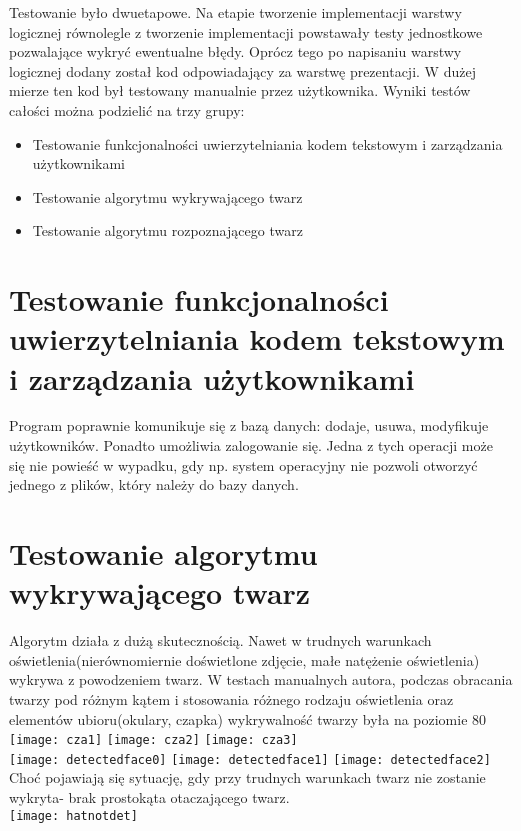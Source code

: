 \documentclass[eng,printmode]{mgr}
\begin{document}
Testowanie było dwuetapowe. Na etapie tworzenie implementacji warstwy logicznej równolegle z tworzenie implementacji powstawały testy jednostkowe pozwalające wykryć ewentualne błędy. Oprócz tego po napisaniu warstwy logicznej dodany został kod odpowiadający za warstwę prezentacji. W dużej mierze ten kod był testowany manualnie przez użytkownika. Wyniki testów całości można podzielić na trzy grupy:
\begin{itemize}
\item{Testowanie funkcjonalności uwierzytelniania kodem tekstowym i zarządzania użytkownikami}
\item{Testowanie algorytmu wykrywającego twarz}
\item{Testowanie algorytmu rozpoznającego twarz}
\end{itemize}

\section{Testowanie funkcjonalności uwierzytelniania kodem tekstowym i zarządzania użytkownikami}
Program poprawnie komunikuje się z bazą danych: dodaje, usuwa, modyfikuje użytkowników. Ponadto umożliwia zalogowanie się. Jedna z tych operacji może się nie powieść w wypadku, gdy np. system operacyjny nie pozwoli otworzyć jednego z plików, który należy do bazy danych.

\section{Testowanie algorytmu wykrywającego twarz}
Algorytm działa z dużą skutecznością. Nawet w trudnych warunkach oświetlenia(nierównomiernie doświetlone zdjęcie, małe natężenie oświetlenia) wykrywa z powodzeniem twarz. W testach manualnych autora, podczas obracania twarzy pod różnym kątem i stosowania różnego rodzaju oświetlenia oraz elementów ubioru(okulary, czapka) wykrywalność twarzy była na poziomie 80%
\texttt{[image: cza1]}
\texttt{[image: cza2]}
\texttt{[image: cza3]}\\
\texttt{[image: detectedface0]}
\texttt{[image: detectedface1]}
\texttt{[image: detectedface2]}\\

Choć pojawiają się sytuację, gdy przy trudnych warunkach twarz nie zostanie wykryta- brak prostokąta otaczającego twarz.\\
\texttt{[image: hatnotdet]}\\
\end{document}
